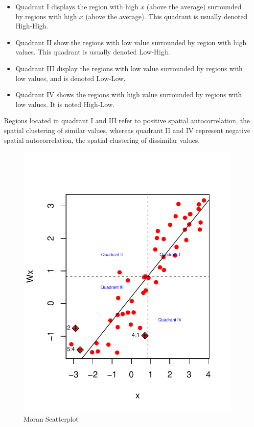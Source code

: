 \begin{itemize}
  \item Quadrant I displays the region with high $x$ (above the average) surrounded by regions with high $x$ (above the average). This quadrant is usually  denoted High-High.
  \item Quadrant II show the regions with low value surrounded by region with high values. This quadrant is usually denoted Low-High.
  \item Quadrant III display the regions with low value surrounded by regions with low values, and is denoted Low-Low.
  \item Quadrant IV shows the regions with high value surrounded by regions with low values. It is noted High-Low.
\end{itemize}

Regions located in quadrant I and III refer to positive spatial autocorrelation, the spatial clustering of similar values, whereas quadrant II and IV represent negative spatial autocorrelation, the spatial clustering of dissimilar values. 

\begin{figure}[ht]
  \caption{Moran Scatterplot}\label{fig:moran_scatterplot}
\begin{knitrout}
\color{fgcolor}

{\centering \includegraphics[width=\maxwidth]{figure/moran-1} 

}


\end{knitrout}
\end{figure}


